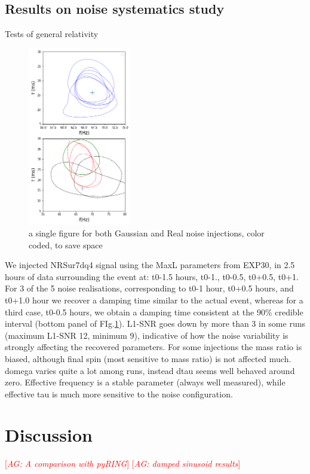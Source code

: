 \documentclass[twocolumn,prd,superscriptaddress,amsfonts,amssymb,amsmath,preprintnumbers]{revtex4-1}
\newcommand{\abhi}[1]{\textcolor{red}{[\textit{AG: #1}]}}
\begin{document}
\subsection{Results on noise systematics study}

Tests of general relativity 

\begin{figure}[H]
	\includegraphics[width=0.4\textwidth]{figures/S190521g_swinjs.png}
	\caption{a single figure for both Gaussian and Real noise injections, color coded, to save space}\label{fig:21g_systematics}
\end{figure}

We injected NRSur7dq4 signal using the MaxL parameters from EXP30, in 2.5 hours of data surrounding the event at: t0-1.5 hours, t0-1., t0-0.5, t0+0.5, t0+1. For 3 of the 5 noise realisations, corresponding to t0-1 hour, t0+0.5 hours, and t0+1.0 hour we recover a damping time similar to the actual event, whereas for a third case, t0-0.5 hours, we obtain a damping time consistent at the 90\% credible interval (bottom panel of FIg.\ref{fig:21g_systematics}). L1-SNR goes down by more than 3 in some runs (maximum L1-SNR 12, minimum 9), indicative of how the noise variability is strongly affecting the recovered parameters. For some injections the mass ratio is biased, although final spin (most sensitive to mass ratio) is not affected much.  domega varies quite a lot among runs, instead dtau seems well behaved around zero. Effective frequency is a stable parameter (always well measured), while effective tau is much more sensitive to the noise configuration.  


\section{Discussion}\label{sec:discussion}

\abhi{A comparison with pyRING}
\abhi{damped sinusoid results}

%


\end{document}
